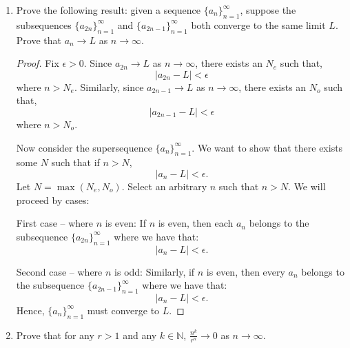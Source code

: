 \documentclass[12pt]{amsart}
\begin{document}
\vspace{0.3cm}

\bigskip
\bigskip
\begin{enumerate}

\setlength{\itemsep}{8pt}
\setlength{\parindent}{0pt}
\setlength{\parskip}{4pt}

\item Prove the following result:  given a sequence $\{a_n\}_{n=1}^\infty$, suppose the subsequences $\{a_{2n}\}_{n=1}^\infty$ and $\{a_{2n-1}\}_{n=1}^\infty$ both converge to the same limit $L$. Prove that $a_n\rightarrow L$ as $n\rightarrow \infty$.
\begin{proof}
Fix $\epsilon > 0$. Since $a_{2n}\to L$ as $n\to\infty$, there exists an $N_e$ such that,
%
\[ | a_{2n} - L | < \epsilon \]
%
where $n>N_e$. Similarly, since $a_{2n-1}\to L$ as $n\to\infty$, there exists an $N_o$ such that,
%
\[ | a_{2n-1} - L | < \epsilon \]
%
where $n>N_o$.

Now consider the supersequence $\{a_n\}_{n=1}^\infty$. We want to show that there exists some $N$ such that if $n>N$,
%
\[ | a_n - L | < \epsilon. \]
%
Let $N=\max (N_e, N_o)$. Select an arbitrary $n$ such that $n>N$. We will proceed by cases:

First case -- where $n$ is even: If $n$ is even, then each $a_n$ belongs to the subsequence $\{a_{2n}\}_{n=1}^\infty$ where we have that:
%
\[ | a_n - L | < \epsilon. \]
%

Second case -- where $n$ is odd: Similarly, if $n$ is even, then every $a_n$ belongs to the subsequence $\{a_{2n-1}\}_{n=1}^\infty$ where we have that:
%
\[ | a_n - L | < \epsilon. \]
%
Hence, $\{a_n\}_{n=1}^\infty$ must converge to $L$.
\end{proof}


\item Prove that for any $r>1$ and any $k\in \mathbb{N}$, $\frac{n^k}{r^n} \rightarrow 0$ as $n\rightarrow \infty$.


\end{enumerate}
\end{document}
